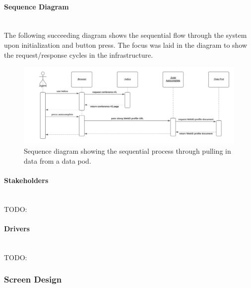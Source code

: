 \paragraph{Sequence Diagram}\mbox{}\\

The following succeeding diagram shows the sequential flow through the system upon initialization and button press. The focus was laid in the diagram to show the request/response cycles in the infrastructure. 

\begin{figure}[H]
    \centering
    \includegraphics[width=\textwidth]{prototype/graphs/poc-conference_registration-autocomplete-sequence_diagram.png}
    \caption{Sequence diagram showing the sequential process through pulling in data from a data pod.}
    \label{fig:poc-conference_registration-autocomplete-sequence_diagram}
\end{figure}

\vspace{0.5cm}
\paragraph{Stakeholders}\mbox{}\\

TODO:
\vspace{0.5cm}
\paragraph{Drivers}\mbox{}\\

TODO:

\subsubsection{Screen Design}\mbox{}\\

